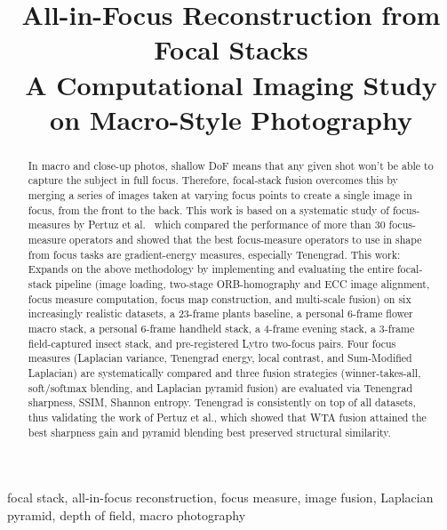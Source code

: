 \documentclass[conference]{IEEEtran}
\begin{document}
\title{All-in-Focus Reconstruction from Focal Stacks\\
\large{A Computational Imaging Study on Macro-Style Photography}}

\author{
}

\maketitle

\begin{abstract}
In macro and close-up photos, shallow DoF means that any given shot won't be able to capture the subject in full focus. Therefore, focal-stack fusion overcomes this by merging a series of images taken at varying focus points to create a single image in focus, from the front to the back. This work is based on a systematic study of focus-measures by Pertuz et al.~\cite{pertuz2013analysis} which compared the performance of more than 30 focus-measure operators and showed that the best focus-measure operators to use in shape from focus tasks are gradient-energy measures, especially Tenengrad. This work: Expands on the above methodology by implementing and evaluating the entire focal-stack pipeline (image loading, two-stage ORB-homography and ECC image alignment, focus measure computation, focus map construction, and multi-scale fusion) on six increasingly realistic datasets, a 23-frame plants baseline, a personal 6-frame flower macro stack, a personal 6-frame handheld stack, a 4-frame evening stack, a 3-frame field-captured insect stack, and pre-registered Lytro two-focus pairs. Four focus measures (Laplacian variance, Tenengrad energy, local contrast, and Sum-Modified Laplacian) are systematically compared and three fusion strategies (winner-takes-all, soft/softmax blending, and Laplacian pyramid fusion) are evaluated via Tenengrad sharpness, SSIM, Shannon entropy. Tenengrad is consistently on top of all datasets, thus validating the work of Pertuz et al., which showed that WTA fusion attained the best sharpness gain and pyramid blending best preserved structural similarity.
\end{abstract}

\begin{IEEEkeywords}
focal stack, all-in-focus reconstruction, focus measure, image fusion, Laplacian pyramid, depth of field, macro photography
\end{IEEEkeywords}
\end{document}
